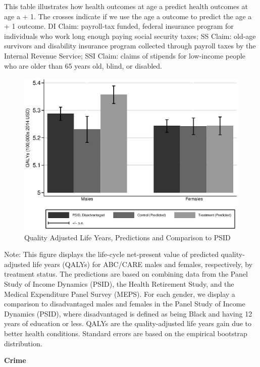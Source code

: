 \documentclass[static]{JJH-Beamer}
\begin{document}
{\flushleft \normalsize This table illustrates how health outcomes at age a predict health outcomes at age a + 1. The crosses indicate if we use the age a outcome to predict the age a + 1 outcome. DI Claim: payroll-tax funded, federal insurance program for individuals who work long enough paying social security taxes; SS Claim: old-age survivors and disability insurance program collected through payroll taxes by the Internal Revenue Service; SSI Claim: claims of stipends for low-income people who are older than 65 years old, blind, or disabled.\\}

\begin{frame}

\begin{figure}[H]
\caption{Quality Adjusted Life Years, Predictions and Comparison to PSID}\label{fig:qalys}
\begin{center}
\includegraphics[width=.85\columnwidth]{output/qalyexppsid.eps}
\end{center}
\end{figure}

\end{frame}

{\flushleft \normalsize Note:  This figure displays the life-cycle net-present value of predicted quality-adjusted life years (QALYs) for ABC/CARE males and females, respectively, by treatment status. The predictions are based on combining data from the Panel Study of Income Dynamics (PSID), the Health Retirement Study, and the Medical Expenditure Panel Survey (MEPS). For each gender, we display a comparison to disadvantaged males and females in the Panel Study of Income Dynamics (PSID), where disadvantaged is defined as being Black and having 12 years of education or less. QALYs are the quality-adjusted life years gain due to better health conditions. Standard errors are based on the empirical bootstrap distribution.\\}
\clearpage
\begin{frame}

\begin{center}
\textbf{Crime}
\end{center}

\end{frame}
\end{document}
